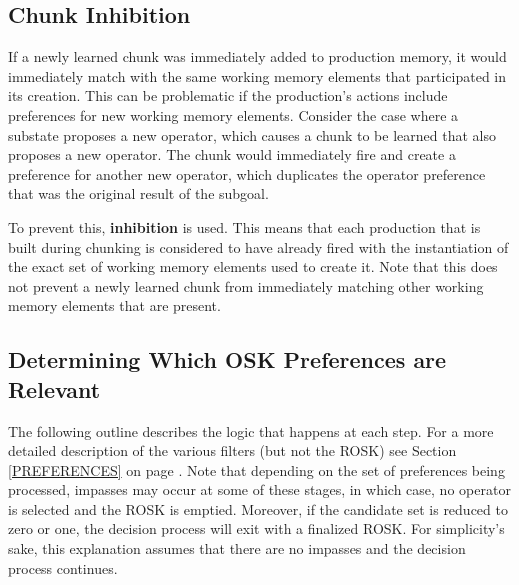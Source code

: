 \subsection{Chunk Inhibition}

If a newly learned chunk was immediately added to production memory, it would immediately match with the same working memory elements that participated in its creation.  This can be problematic if the production's actions include preferences for new working memory elements.  Consider the case where a substate proposes a new operator, which causes a chunk to be learned that also proposes a new operator. The chunk would immediately fire and create a preference for another new operator, which duplicates the operator preference that was the original result of the subgoal. 

To prevent this, \textbf{inhibition} is used. This means that each production that is built during chunking is considered to have already fired with the instantiation of the exact set of working memory elements used to create it. Note that this does not prevent a newly learned chunk from immediately matching other working memory elements that are present.

\subsection{Determining Which OSK Preferences are Relevant}
\label{CHUNKING-subtleties-osk}

The following outline describes the logic that happens at each step. For a more detailed description of the various filters (but not the ROSK) see Section \ref{PREFERENCES} on page \pageref{PREFERENCES}. Note that depending on the set of preferences being processed, impasses may occur at some of these stages, in which case, no operator is selected and the ROSK is emptied. Moreover, if the candidate set is reduced to zero or one, the decision process will exit with a finalized ROSK. For simplicity's sake, this explanation assumes that there are no impasses and the decision process continues.

